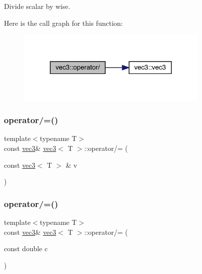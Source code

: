 Divide scalar by wise. 

Here is the call graph for this function\+:\nopagebreak
\begin{figure}[H]
\begin{center}
\leavevmode
\includegraphics[width=263pt]{structvec3_aefb92d2dd7d6410991dffc593e9ab874_cgraph}
\end{center}
\end{figure}
\mbox{\label{structvec3_a4e52fc3e08391056d0e6e01a0375c395}} 
\subsubsection{\texorpdfstring{operator/=()}{operator/=()}\hspace{0.1cm}{\footnotesize\ttfamily [1/2]}}
{\footnotesize\ttfamily template$<$typename T$>$ \\
const \mbox{\hyperlink{structvec3}{vec3}}\& \mbox{\hyperlink{structvec3}{vec3}}$<$ T $>$\+::operator/= (\begin{DoxyParamCaption}\item[{const \mbox{\hyperlink{structvec3}{vec3}}$<$ T $>$ \&}]{v }\end{DoxyParamCaption})\hspace{0.3cm}{\ttfamily [inline]}}

\mbox{\label{structvec3_ae6d5d20d8b6b4ae286c51b0cb10e5bd0}} 
\subsubsection{\texorpdfstring{operator/=()}{operator/=()}\hspace{0.1cm}{\footnotesize\ttfamily [2/2]}}
{\footnotesize\ttfamily template$<$typename T$>$ \\
const \mbox{\hyperlink{structvec3}{vec3}}\& \mbox{\hyperlink{structvec3}{vec3}}$<$ T $>$\+::operator/= (\begin{DoxyParamCaption}\item[{const double}]{c }\end{DoxyParamCaption})\hspace{0.3cm}{\ttfamily [inline]}}

